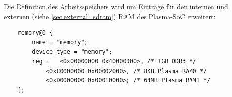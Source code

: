 %		
%		
%	



Die Definition des Arbeitsspeichers wird um Einträge für den internen und externen (siehe \cref{sec:external_sdram}) \gls{RAM} des Plasma-SoC erweitert:
\begin{code}
	\begin{verbatim}
	memory@0 {
		name = "memory";
		device_type = "memory";
		reg =   <0x00000000 0x40000000>, /* 1GB DDR3 */
			<0xC0000000 0x00002000>, /* 8KB Plasma RAM0 */
			<0xD0000000 0x00010000>; /* 64MB Plasma RAM1 */
	};
	\end{verbatim}
	\caption{Devicetree: Arbeitsspeicherdefinition}
	\label{lst:custom_dts_memory_defs}
\end{code}

